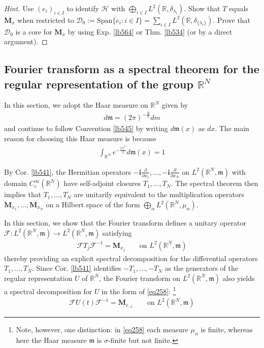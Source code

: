 \documentclass[12pt,b5paper,notitlepage]{article}
\theoremstyle{definition}
\theoremstyle{plain}
\newcommand{\Dom}{\mathscr{D}}
\newcommand{\Span}{\mathrm{Span}}
\newcommand{\im}{\mathbf{i}}
\newcommand{\Rbb}{\mathbb R}
\newcommand{\mk}{\mathfrak m}
\newcommand{\MF}{\mathcal F}
\newcommand{\MH}{\mathcal H}
\newcommand{\Mbf}{\mathbf M}
\numberwithin{equation}{section}
\begin{document}
\begin{proof}[Hint]
Use $(e_i)_{i\in I}$ to identify $\MH$ with $\bigoplus_{i\in I}L^2(\Rbb,\delta_{\lambda_i})$. Show that $T$ equals $\Mbf_x$ when restricted to $\Dom_0:=\Span\{e_i:i\in I\}=\sum_{i\in I}L^2(\Rbb,\delta_{\{\lambda_i\}})$. Prove that $\Dom_0$ is a core for $\Mbf_x$ by using Exp. \ref{lb564} or Thm. \ref{lb534} (or by a direct argument).
\end{proof}




\subsection{Fourier transform as a spectral theorem for the regular representation of the group $\Rbb^N$}\label{lb525}



In this section, we adopt the Haar measure on $\Rbb^N$ given by
\begin{align*}
d\mk=(2\pi)^{-\frac N2}dm
\end{align*}
and continue to follow Convention \ref{lb545} by writing $d\mk(x)$ as $dx$. The main reason for choosing this Haar measure is because
\begin{align}\label{eq263}
\int_{\Rbb^N}e^{-\frac{|x|^2}2}d\mk(x)=1
\end{align}

By Cor. \ref{lb541}, the Hermitian operators $-\im\frac{\partial}{\partial x_1},\dots,-\im\frac{\partial}{\partial x_N}$ on $L^2(\Rbb^N,\mk)$ with domain $C_c^\infty(\Rbb^N)$ have self-adjoint closures $T_1,\dots,T_N$. The spectral theorem then implies that $T_1,\dots,T_N$ are unitarily equivalent to the multiplication operators $\Mbf_{x_1},\dots,\Mbf_{x_N}$ on a Hilbert space of the form $\bigoplus_\alpha L^2(\Rbb^N,\mu_\alpha)$.

In this section, we show that the Fourier transform defines a unitary operator $\MF:L^2(\Rbb^N,\mk)\rightarrow L^2(\Rbb^N,\mk)$ satisfying
\begin{align*}
\MF T_j \MF^{-1}=\Mbf_{x_j}\qquad\text{on }L^2(\Rbb^N,\mk)
\end{align*}
thereby providing an explicit spectral decomposition for the differential operators $T_1,\dots,T_N$. Since Cor. \ref{lb541} identifies $-T_1,\dots,-T_N$ as the generators of the regular representation $U$ of $\Rbb^N$, the Fourier transform on $L^2(\Rbb^N,\mk)$ also yields a spectral decomposition for $U$ in the form of \eqref{eq258}: \footnote{Note, however, one distinction: in \eqref{eq258} each measure $\mu_\alpha$ is finite, whereas here the Haar measure $\mk$ is $\sigma$-finite but not finite.}
\begin{align*}
\MF U(t)\MF^{-1}=\Mbf_{e_{-t}}\qquad\text{on }L^2(\Rbb^N,\mk)
\end{align*}
\end{document}
